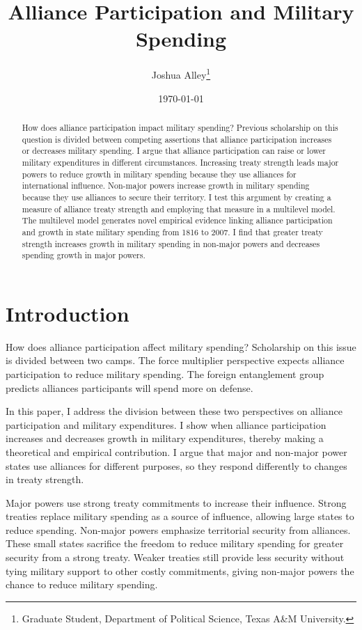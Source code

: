 \documentclass[12pt]{article}
\title{\textbf{Alliance Participation and Military Spending}}
\author{Joshua Alley\footnote{Graduate Student,
Department of Political Science, Texas A\&M University.}}
\date{{\normalsize \today}}
\begin{document}
\maketitle 

\newpage 

\doublespace 

\begin{abstract}
How does alliance participation impact military spending? 
Previous scholarship on this question is divided between competing assertions that alliance participation increases or decreases military spending. 
I argue that alliance participation can raise or lower military expenditures in different circumstances. 
Increasing treaty strength leads major powers to reduce growth in military spending because they use alliances for international influence. 
Non-major powers increase growth in military spending because they use alliances to secure their territory. 
I test this argument by creating a measure of alliance treaty strength and employing that measure in a multilevel model. 
The multilevel model generates novel empirical evidence linking alliance participation and growth in state military spending from 1816 to 2007. 
I find that greater treaty strength increases growth in military spending in non-major powers and decreases spending growth in major powers.  
\end{abstract}



\section{Introduction}


How does alliance participation affect military spending? 
Scholarship on this issue is divided between two camps. 
The force multiplier perspective expects alliance participation to reduce military spending. 
The foreign entanglement group predicts alliances participants will spend more on defense. 


In this paper, I address the division between these two perspectives on alliance participation and military expenditures. 
I show when alliance participation increases and decreases growth in military expenditures, thereby making a theoretical and empirical contribution. 
I argue that major and non-major power states use alliances for different purposes, so they respond differently to changes in treaty strength.


Major powers use strong treaty commitments to increase their influence. 
Strong treaties replace military spending as a source of influence, allowing large states to reduce spending. 
Non-major powers emphasize territorial security from alliances.  
These small states sacrifice the freedom to reduce military spending for greater security from a strong treaty. 
Weaker treaties still provide less security without tying military support to other costly commitments, giving non-major powers the chance to reduce military spending. 
\end{document}
